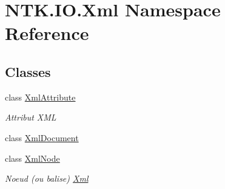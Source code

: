 \hypertarget{namespace_n_t_k_1_1_i_o_1_1_xml}{}\section{N\+T\+K.\+I\+O.\+Xml Namespace Reference}
\label{namespace_n_t_k_1_1_i_o_1_1_xml}
\subsection*{Classes}
\begin{DoxyCompactItemize}
\item 
class \mbox{\hyperlink{class_n_t_k_1_1_i_o_1_1_xml_1_1_xml_attribute}{Xml\+Attribute}}
\begin{DoxyCompactList}\small\item\em Attribut X\+ML \end{DoxyCompactList}\item 
class \mbox{\hyperlink{class_n_t_k_1_1_i_o_1_1_xml_1_1_xml_document}{Xml\+Document}}
\item 
class \mbox{\hyperlink{class_n_t_k_1_1_i_o_1_1_xml_1_1_xml_node}{Xml\+Node}}
\begin{DoxyCompactList}\small\item\em Noeud (ou balise) \mbox{\hyperlink{namespace_n_t_k_1_1_i_o_1_1_xml}{Xml}} \end{DoxyCompactList}\end{DoxyCompactItemize}
